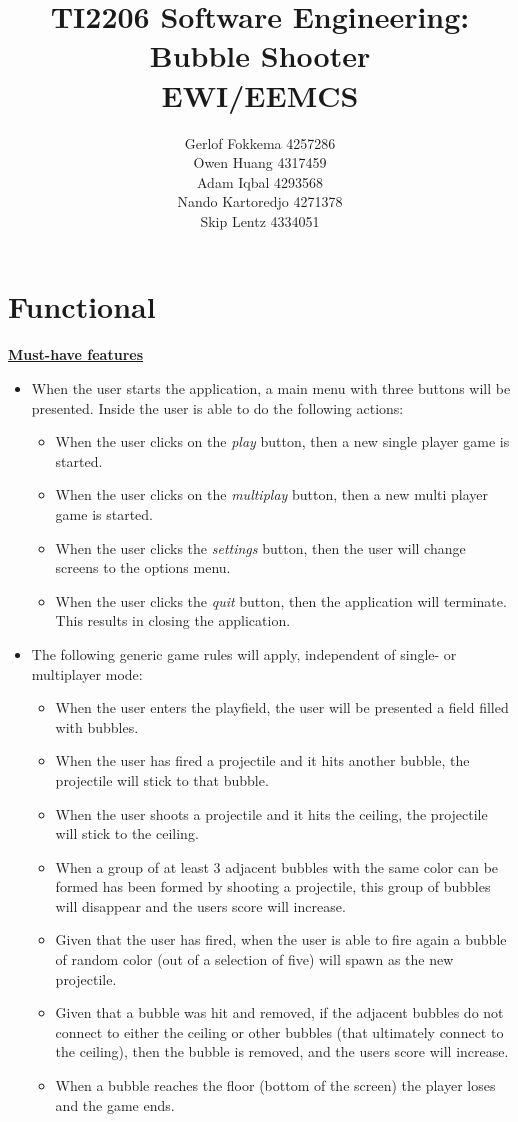 \documentclass[a4paper,11pt]{article}
\title{TI2206 Software Engineering: Bubble Shooter \\ EWI/EEMCS}
\author{Gerlof Fokkema 4257286 \\
	Owen Huang 4317459 \\
	Adam Iqbal 4293568 \\
	Nando Kartoredjo 4271378 \\
	Skip Lentz 4334051 \\
}
\begin{document}
\maketitle

\thispagestyle{empty}
\newpage
\setcounter{page}{1}

\section*{Functional}
\textbf{\underline{Must-have features}}
\begin{itemize}
  \item When the user starts the application, a main menu with three buttons will be presented. Inside the user is able to do the following actions:
  \begin{itemize}
    \item When the user clicks on the \textit{play} button, then a new single player game is started.
    \item When the user clicks on the \textit{multiplay} button, then a new multi player game is started.
    \item When the user clicks the \textit{settings} button, then the user will change screens to the options menu.
    \item When the user clicks the \textit{quit} button, then the application will terminate. This results in closing the application.
  \end{itemize}

  \item The following generic game rules will apply, independent of single- or multiplayer mode:
  \begin{itemize}
    \item When the user enters the playfield, the user will be presented a field filled with bubbles.
    \item When the user has fired a projectile and it hits another bubble, the projectile will stick to that bubble.
    \item When the user shoots a projectile and it hits the ceiling, the projectile will stick to the ceiling.
    \item When a group of at least 3 adjacent bubbles with the same color can be formed has been formed by shooting a projectile, this group of bubbles will disappear and the users score will increase.
    \item Given that the user has fired, when the user is able to fire again a bubble of random color (out of a selection of five) will spawn as the new projectile.
    \item Given that a bubble was hit and removed, if the adjacent bubbles do not connect to either the ceiling or other bubbles (that ultimately connect to the ceiling), then the bubble is removed, and the users score will increase.
    \item When a bubble reaches the floor (bottom of the screen) the player loses and the game ends.
  \end{itemize}


\end{itemize}
\end{document}
